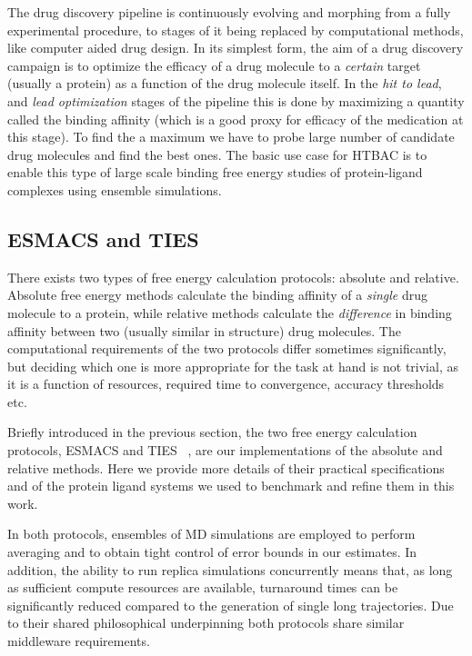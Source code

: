 
The drug discovery pipeline is continuously evolving and morphing from a fully experimental procedure, to stages of it being replaced by computational methods, like computer aided drug design. In its simplest form, the aim of a drug discovery campaign is to optimize the efficacy of a drug molecule to a \emph{certain} target (usually a protein) as a function of the drug molecule itself. In the \emph{hit to lead}, and \emph{lead optimization} stages of the pipeline this is done by maximizing a quantity called the binding affinity (which is a good proxy for efficacy of the medication at this stage). To find the a maximum we have to probe large number of candidate drug molecules and find the best ones. The basic use case for HTBAC is to enable this type of large scale binding free energy studies of protein-ligand complexes using ensemble simulations. 

\subsection{ESMACS and TIES}


There exists two types of free energy calculation protocols: absolute and relative. Absolute free energy methods calculate the binding affinity of a \emph{single} drug molecule to a protein, while relative methods calculate the \emph{difference} in binding affinity between two (usually similar in structure) drug molecules. The computational requirements of the two protocols differ sometimes significantly, but deciding which one is more appropriate for the task at hand is not trivial, as it is a function of resources, required time to convergence, accuracy thresholds etc.

Briefly introduced in the previous section, the two free energy calculation protocols, ESMACS and TIES ~\cite{Wan2017brd4, Bhati2017}, are our implementations of the absolute and relative methods. Here we provide more details of their practical specifications and of the protein ligand systems we used to benchmark and refine them in this work.


In both protocols, ensembles of MD simulations are employed to perform averaging and to obtain tight control of error bounds in our estimates. In addition, the ability to run replica simulations concurrently means that, as long as sufficient compute resources are available, turnaround times can be  significantly reduced compared to the generation of single long trajectories. Due to their shared philosophical underpinning both protocols share similar middleware requirements.

